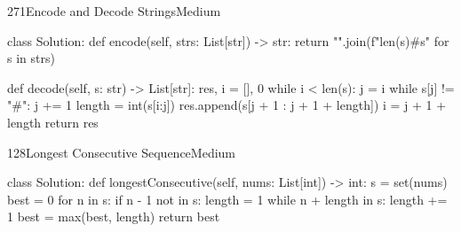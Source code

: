 \begin{problem}{271}{Encode and Decode Strings}{Medium}
\begin{code}
class Solution:
    def encode(self, strs: List[str]) -> str:
        return "".join(f"{len(s)}#{s}" for s in strs)

    def decode(self, s: str) -> List[str]:
        res, i = [], 0
        while i < len(s):
            j = i
            while s[j] != "#":
                j += 1
            length = int(s[i:j])
            res.append(s[j + 1 : j + 1 + length])
            i = j + 1 + length
        return res
\end{code}
\end{problem}

\begin{problem}{128}{Longest Consecutive Sequence}{Medium}
\begin{code}
class Solution:
    def longestConsecutive(self, nums: List[int]) -> int:
        s = set(nums)
        best = 0
        for n in s:
            if n - 1 not in s:
                length = 1
                while n + length in s:
                    length += 1
                best = max(best, length)
        return best
\end{code}
\end{problem}
